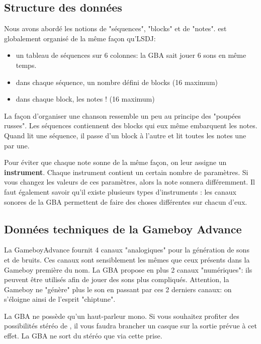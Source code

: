 \subsection{Structure des données}

Nous avons abordé les notions de "séquences", "blocks" et de "notes".
\FAT est globalement organisé de la même façon qu'LSDJ:
\medskip

\begin{itemize}
  \item{un tableau de séquences sur 6 colonnes: la GBA sait jouer 6 sons en même temps.}
  \item{dans chaque séquence, un nombre défini de blocks (16 maximum)}
  \item{dans chaque block, les notes ! (16 maximum)}
\end{itemize}
\medskip

La façon d'organiser une chanson ressemble un peu au principe des "poupées russes".
Les séquences contiennent des blocks qui eux même embarquent les notes.
Quand \FAT lit une séquence, il passe d'un block à l'autre et lit toutes les notes une par une.
\medskip

Pour éviter que chaque note sonne de la même façon, on leur assigne un {\bf instrument}.
Chaque instrument contient un certain nombre de paramètres.
Si vous changez les valeurs de ces paramètres, alors la note sonnera différemment.
Il faut également savoir qu'il existe plusieurs types d'instruments : les canaux sonores de la GBA permettent de faire des choses différentes sur chacun d'eux.

\subsection{Données techniques de la Gameboy Advance}

La GameboyAdvance fournit 4 canaux "analogiques" pour la génération de sons et de bruits.
Ces canaux sont sensiblement les mêmes que ceux présents dans la Gameboy première du nom.
La GBA propose en plus 2 canaux "numériques": ils peuvent être utilisés afin de jouer des sons plus compliqués.
Attention, la Gameboy ne "génère" plus le son en passant par ces 2 derniers canaux: on s'éloigne ainsi de l'esprit "chiptune".

La GBA ne possède qu'un haut-parleur mono.
Si vous souhaitez profiter des possibilités stéréo de \FAT, il vous faudra brancher un casque sur la sortie prévue à cet effet.
La GBA ne sort du stéréo que via cette prise.

